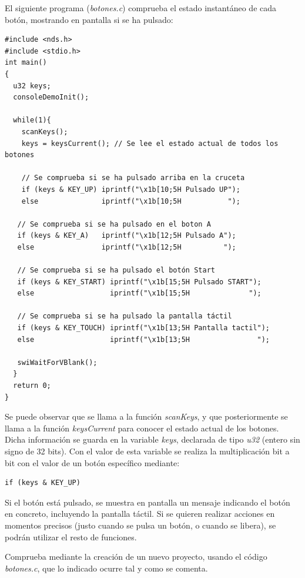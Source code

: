 \begin{example}
El siguiente programa (\textit{botones.c}) comprueba el estado instantáneo de cada botón, mostrando en pantalla si se ha pulsado: 
\begin{lstlisting}
#include <nds.h>
#include <stdio.h>
int main()
{
  u32 keys;
  consoleDemoInit();

  while(1){
    scanKeys();
    keys = keysCurrent(); // Se lee el estado actual de todos los botones

    // Se comprueba si se ha pulsado arriba en la cruceta
    if (keys & KEY_UP) iprintf("\x1b[10;5H Pulsado UP");
    else               iprintf("\x1b[10;5H           ");

   // Se comprueba si se ha pulsado en el boton A
   if (keys & KEY_A)   iprintf("\x1b[12;5H Pulsado A");
   else                iprintf("\x1b[12;5H          ");

   // Se comprueba si se ha pulsado el botón Start
   if (keys & KEY_START) iprintf("\x1b[15;5H Pulsado START");
   else                  iprintf("\x1b[15;5H              ");

   // Se comprueba si se ha pulsado la pantalla táctil
   if (keys & KEY_TOUCH) iprintf("\x1b[13;5H Pantalla tactil");
   else                  iprintf("\x1b[13;5H                ");

   swiWaitForVBlank();
  }
  return 0;
}
\end{lstlisting}
\end{example}
	
Se puede observar que se llama a la función \textit{scanKeys}, y que posteriormente se llama a la función \textit{keysCurrent} para conocer el estado actual de los botones. Dicha información se guarda en la variable \textit{keys}, declarada de tipo \textit{u32} (entero sin signo de 32 bits). Con el valor de esta variable se realiza la multiplicación bit a bit con el valor de un botón específico mediante:
\begin{lstlisting}
if (keys & KEY_UP)
\end{lstlisting}

Si el botón está pulsado, se muestra en pantalla un mensaje indicando el  botón en concreto, incluyendo la pantalla táctil. Si se quieren realizar
acciones en momentos precisos (justo cuando se pulsa un botón, o cuando se libera), se podrán utilizar el resto de funciones.

\begin{exercise}
Comprueba mediante la creación de un nuevo proyecto, usando el código \textit{botones.c}, que lo indicado ocurre tal y como se comenta.
\end{exercise}

